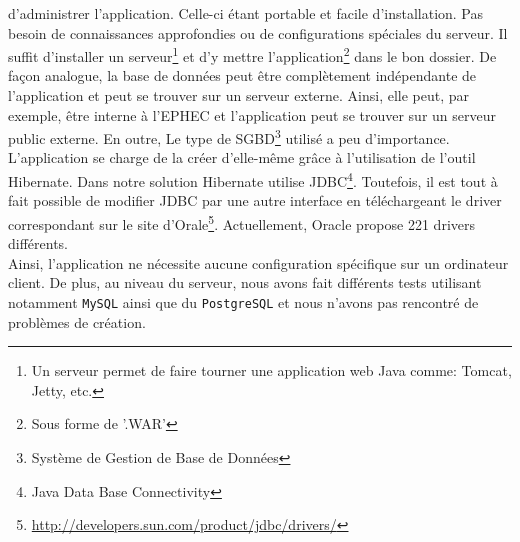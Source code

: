 d'administrer l'application. Celle-ci étant portable et facile d'installation.
Pas besoin de connaissances approfondies ou de configurations spéciales du
serveur. Il suffit d'installer un serveur\footnote{Un serveur permet
de faire tourner une application web Java comme: Tomcat, Jetty, etc.} et d'y
mettre l'application\footnote{Sous forme de '.WAR'} dans le bon dossier.
\newline
\indent
De façon analogue, la base de données peut être complètement indépendante de l'application et peut se trouver sur un serveur externe. Ainsi, elle peut, par exemple, être interne à l'EPHEC et l'application peut se trouver sur un serveur public externe. En outre, 
Le type de SGBD\footnote{Système de Gestion de Base de Données} utilisé a peu d'importance. L'application se charge de la créer d'elle-même
grâce à l'utilisation de l'outil Hibernate. Dans notre solution Hibernate utilise JDBC\footnote{Java Data Base Connectivity}.
\newline
\indent
Toutefois, il est tout à fait possible de modifier JDBC par une autre interface en téléchargeant le driver correspondant sur le site d'Orale\footnote{\url{http://developers.sun.com/product/jdbc/drivers/}}. Actuellement, Oracle propose 221 drivers différents.\\
\newline
\indent
Ainsi, l'application ne nécessite aucune configuration spécifique sur un ordinateur client. De plus, au niveau du serveur, nous avons fait différents tests utilisant notamment \texttt{MySQL} ainsi que du \texttt{PostgreSQL} et nous n'avons pas rencontré de problèmes de création.

